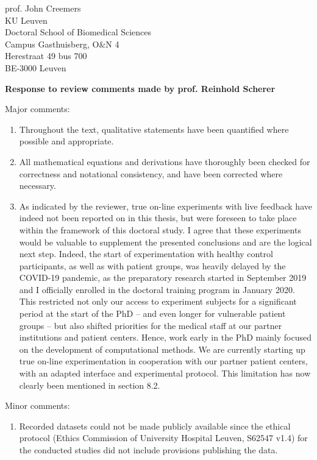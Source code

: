 \documentclass{letter}
\newcommand{\reply}[1]{%
	\textbf{Response to review comments made by prof. #1}

}
\begin{document}
\begin{letter}{%
	prof. John Creemers \\
	KU Leuven \\
	Doctoral School of Biomedical Sciences \\
	Campus Gasthuisberg, O\&N 4 \\
	Herestraat 49 bus 700 \\
	BE-3000 Leuven

}
\reply{Reinhold Scherer}
Major comments:
\begin{enumerate}
	\item Throughout the text, qualitative statements have been quantified where possible and appropriate.
	\item  All mathematical equations and derivations have thoroughly
	been checked for correctness and notational consistency, and have been
	corrected where necessary.
	\item As indicated by the reviewer, true on-line experiments with live
	feedback have indeed not been reported on in this thesis,
  but were foreseen to take	place within the framework of this doctoral study.
	I agree that these experiments would be valuable to supplement the
	presented conclusions and are the logical next step.
	Indeed, the start of experimentation with healthy control participants,
	as well as with patient groups, was heavily delayed by the COVID-19 pandemic, as the
	preparatory research started in September 2019 and I officially
	enrolled in the doctoral training program in January 2020.
	This restricted not only our access to experiment subjects for a
	significant period at the start of the PhD -- and even longer for
	vulnerable patient groups -- but also shifted priorities for the medical
	staff at our partner institutions and patient centers.
	Hence, work early in the PhD mainly focused on the development of
	computational methods.
	We are currently starting up true on-line experimentation in cooperation
	with our partner patient centers, with an adapted interface and experimental protocol.
  This limitation has now clearly been mentioned in section 8.2.
\end{enumerate}
Minor comments:
\begin{enumerate}
	\item Recorded datasets could not be made publicly available since the
	ethical protocol (Ethics Commission of University Hospital Leuven,
	S62547 v1.4) for the conducted studies did not include provisions
	publishing the data.
\end{enumerate}


\end{letter}
\end{document}
